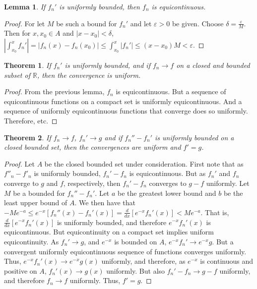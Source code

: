 \documentclass[oneside]{book}
\theoremstyle{mystyle}
\newtheorem{theorem}{Theorem}[section]
\newtheorem{lemma}{Lemma}[section]
\begin{document}
\begin{lemma}
If $f_n'$ is uniformly bounded, then $f_n$ is equicontinuous.
\end{lemma}
\begin{proof}
For let $M$ be such a bound for $f_n'$ and let $\varepsilon>0$ be given. Choose $\delta = \frac{\varepsilon}{M}$. Then for $x,x_0\in A$ and $|x-x_0|<\delta$, $|\int_{x_0}^{x}f_n'| =|f_n(x)-f_n(x_0)| \leq \int_{x_0}^{x}|f_n'| \leq (x-x_0)M < \varepsilon$.
\end{proof}

\begin{theorem}
If $f_n'$ is uniformly bounded, and if $f_n \rightarrow f$ on a closed and bounded subset of $\mathbb{R}$, then the convergence is uniform.
\end{theorem}
\begin{proof}
From the previous lemma, $f_n$ is equicontinuous. But a sequence of equicontinuous functions on a compact set is uniformly equicontinuous. And a sequence of uniformly equicontinuous functions that converge does so uniformly. Therefore, etc.
\end{proof}

\begin{theorem}
If $f_n \rightarrow f$, $f_n'\rightarrow g$ and if $f_n''-f_n'$ is uniformly bounded on a closed bounded set, then the convergences are uniform and $f' = g$.
\end{theorem}
\begin{proof}
Let $A$ be the closed bounded set under consideration. First note that as $f''_n - f'_n$ is uniformly bounded, $f_n'-f_n$ is equicontinuous. But as $f_n'$ and $f_n$ converge to $g$ and $f$, respectively, then $f_n'-f_n$ converges to $g-f$ uniformly. Let $M$ be a bounded for $f_n''-f_n'$. Let $a$ be the greatest lower bound and $b$ be the least upper bound of $A$. We then have that $-Me^{-a}\leq e^{-x}[f_n''(x)-f_n'(x)]=\frac{d}{dx}[e^{-x}f_n'(x)] < Me^{-a}$. That is, $\frac{d}{dx}[e^{-x}f_n'(x)]$ is uniformly bounded, and therefore $e^{-x}f_n'(x)$ is equicontinuous. But equicontinuity on a compact set implies uniform equicontinuity. As $f_n'\rightarrow g$, and $e^{-x}$ is bounded on $A$, $e^{-x}f_n'\rightarrow e^{-x}g$. But a convergent uniformly equicontinuous sequence of functions converges uniformly. Thus, $e^{-x}f_n'(x) \rightarrow e^{-x}g(x)$ uniformly, and therefore, as $e^{-x}$ is continuous and positive on $A$, $f_n'(x)\rightarrow g(x)$ uniformly. But also $f_n'-f_n \rightarrow g-f$ uniformly, and therefore $f_n \rightarrow f$ uniformly. Thus, $f'=g$.
\end{proof}
\end{document}
